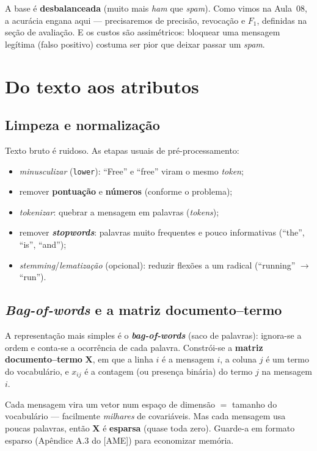 \documentclass[11pt,a4paper]{article}
\begin{document}
\begin{atencao}
A base é \textbf{desbalanceada} (muito mais \emph{ham} que \emph{spam}). Como vimos
na Aula~08, a acurácia engana aqui --- precisaremos de precisão, revocação e $F_1$,
definidas na seção de avaliação. E os custos são assimétricos: bloquear uma mensagem legítima (falso positivo)
costuma ser pior que deixar passar um \emph{spam}.
\end{atencao}

\section{Do texto aos atributos}
\subsection{Limpeza e normalização}
Texto bruto é ruidoso. As etapas usuais de pré-processamento:
\begin{itemize}[leftmargin=1.4cm,nosep]
  \item \emph{minusculizar} (\texttt{lower}): ``Free'' e ``free'' viram o mesmo
        \emph{token};
  \item remover \textbf{pontuação} e \textbf{números} (conforme o problema);
  \item \emph{tokenizar}: quebrar a mensagem em palavras (\emph{tokens});
  \item remover \textbf{\emph{stopwords}}: palavras muito frequentes e pouco
        informativas (``the'', ``is'', ``and'');
  \item \emph{stemming}/\emph{lematização} (opcional): reduzir flexões a um radical
        (``running'' $\to$ ``run'').
\end{itemize}

\subsection{\emph{Bag-of-words} e a matriz documento--termo}
A representação mais simples é o \textbf{\emph{bag-of-words}} (saco de palavras):
ignora-se a ordem e conta-se a ocorrência de cada palavra. Constrói-se a
\textbf{matriz documento--termo} $\bm{X}$, em que a linha $i$ é a mensagem $i$, a
coluna $j$ é um termo do vocabulário, e $x_{ij}$ é a contagem (ou presença binária)
do termo $j$ na mensagem $i$.

\begin{ideia}
Cada mensagem vira um vetor num espaço de dimensão $=$ tamanho do vocabulário ---
facilmente \emph{milhares} de covariáveis. Mas cada mensagem usa poucas palavras,
então $\bm{X}$ é \textbf{esparsa} (quase toda zero). Guarde-a em formato esparso
(Apêndice A.3 do [AME]) para economizar memória.
\end{ideia}
\end{document}
